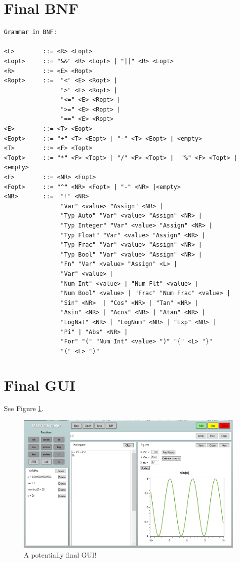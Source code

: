 \documentclass[a4paper, oneside, 11pt]{report}
\begin{document}
\section{Final BNF}
\begin{verbatim}
Grammar in BNF:

<L>        ::= <R> <Lopt>
<Lopt>     ::= "&&" <R> <Lopt> | "||" <R> <Lopt> 
<R>        ::= <E> <Ropt>
<Ropt>     ::=  "<" <E> <Ropt> | 
                ">" <E> <Ropt> |  
                "<=" <E> <Ropt> | 
                ">=" <E> <Ropt> |
                "==" <E> <Ropt>
<E>        ::= <T> <Eopt>
<Eopt>     ::= "+" <T> <Eopt> | "-" <T> <Eopt> | <empty>
<T>        ::= <F> <Topt>
<Topt>     ::= "*" <F> <Topt> | "/" <F> <Topt> |  "%" <F> <Topt> |<empty>
<F>        ::= <NR> <Fopt>
<Fopt>     ::= "^" <NR> <Fopt> | "-" <NR> |<empty> 
<NR>       ::=  "!" <NR>
                "Var" <value> "Assign" <NR> |
                "Typ Auto" "Var" <value> "Assign" <NR> |
                "Typ Integer" "Var" <value> "Assign" <NR> |
                "Typ Float" "Var" <value> "Assign" <NR> |
                "Typ Frac" "Var" <value> "Assign" <NR> |
                "Typ Bool" "Var" <value> "Assign" <NR> |
                "Fn" "Var" <value> "Assign" <L> |
                "Var" <value> |
                "Num Int" <value> | "Num Flt" <value> |
                "Num Bool" <value> | "Frac" "Num Frac" <value> |
                "Sin" <NR>  | "Cos" <NR> | "Tan" <NR> |
                "Asin" <NR> | "Acos" <NR> | "Atan" <NR> |
                "LogNat" <NR> | "LogNum" <NR> | "Exp" <NR> |
                "Pi" | "Abs" <NR> |
                "For" "(" "Num Int" <value> ")" "{" <L> "}"
                "(" <L> ")"
\end{verbatim}
\section{Final GUI}

See Figure \ref{gui02}.

\begin{figure}[htb]
\includegraphics[width=0.9 \columnwidth]{GUI_02.png}
\caption{A potentially final GUI!}
\label{gui02}
\end{figure}
\end{document}
